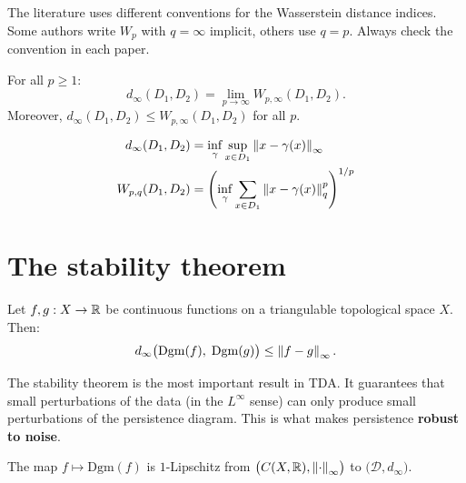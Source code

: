 \begin{attention}[title=\textbf{Varying conventions}]
The literature uses different conventions for the Wasserstein distance
indices. Some authors write $W_p$ with $q = \infty$ implicit, others
use $q = p$. Always check the convention in each paper.
\end{attention}

\begin{proposition}
For all $p \geq 1$:
\[
  d_\infty(D_1, D_2) = \lim_{p \to \infty} W_{p,\infty}(D_1, D_2).
\]
Moreover, $d_\infty(D_1, D_2) \leq W_{p,\infty}(D_1, D_2)$ for all $p$.
\end{proposition}

\begin{keyformulas}[title=\textbf{Summary of distances}]
\begin{align}
  d_\infty(D_1, D_2) &= \inf_{\gamma} \sup_{x \in D_1}
    \left\| x - \gamma(x) \right\|_\infty \\
  W_{p,q}(D_1, D_2) &= \left(\inf_{\gamma}
    \sum_{x \in D_1} \left\| x - \gamma(x) \right\|_q^p\right)^{1/p}
\end{align}
\end{keyformulas}

\section{The stability theorem}
\label{sec:stability}

\begin{theorem}
\label{thm:stability}
Let $f, g : X \to \mathbb{R}$ be continuous functions on a triangulable
topological space $X$. Then:
\[
  d_\infty\bigl(\mathrm{Dgm}(f),\; \mathrm{Dgm}(g)\bigr) \leq
  \left\| f - g \right\|_\infty.
\]
\end{theorem}

\begin{intuition}
The stability theorem is the most important result in TDA. It
guarantees that small perturbations of the data (in the $L^\infty$
sense) can only produce small perturbations of the persistence
diagram. This is what makes persistence \textbf{robust to noise}.
\end{intuition}

\begin{corollary}
The map $f \mapsto \mathrm{Dgm}(f)$ is $1$-Lipschitz from
$\bigl(C(X, \mathbb{R}), \left\| \cdot \right\|_\infty\bigr)$ to
$\bigl(\mathcal{D}, d_\infty\bigr)$.
\end{corollary}


